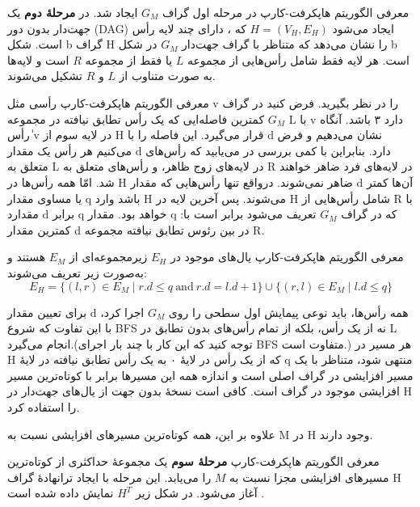 \begin{itemframe}{‌معرفی الگوریتم هاپکرفت-کارپ}
\decLineSpace[-1mm]
\itm
در مرحله اول گراف $G_M$ ایجاد شد. در \textbf{مرحلهٔ دوم} یک جهت‌دار بدون دور (DAG) ایجاد می‌شود $H = (V_H, E_H)$ که ، دارای چند لایه‌ رأس است.
\itm
شکل b گراف H را نشان می‌دهد که متناظر با گراف جهت‌دار $G_M$ در شکل b است. هر لایه فقط شامل رأس‌هایی از مجموعه $L$ یا فقط از مجموعه $R$ است و لایه‌ها به صورت متناوب از $L$ و $R$ تشکیل می‌شوند.
\end{itemframe}


\begin{itemframe}{‌معرفی الگوریتم هاپکرفت-کارپ}
\itm
رأسی مثل v را در نظر بگیرید. فرض کنید در گراف $G_M$ کمترین فاصله‌ایی که یک رأس تطابق نیافته در مجموعه L با v دارد ۳ باشد. آنگاه ٰرأس v در لایه سوم از H‌ قرار می‌‌گیرد. این فاصله را با d نشان می‌دهیم و فرض می‌کنیم هر رأس یک مقدار d دارد.
\itm
بنابراین با کمی بررسی در می‌یابید که رأس‌های متعلق به L در لایه‌های زوج ظاهر، و رأس‌های متعلق به R در لایه‌های فرد ضاهر خواهند شد.
\itm
امّا همه رأس‌ها در H ضاهر نمی‌شوند. درواقع تنها رأس‌هایی که مقدار d آن‌ها کمتر یا مساوی مقدار q باشد وارد H می‌شوند. پس آخرین لایه در H شامل رأس‌هایی از R با مقدارد d برابر q خواهد بود.
\itm
مقدار q که در گراف $G_M$ تعریف می‌شود برابر است با: کمترین مقدار d در بین رئوس تطابق نیافته مجموعه R.

\end{itemframe}


\begin{itemframe}{‌معرفی الگوریتم هاپکرفت-کارپ}
\itm
یال‌های موجود در $E_H$ زیرمجموعه‌ای از $E_M$ هستند و به‌صورت زیر تعریف می‌شوند:
$$
E_H = \{ (l, r) \in E_M \mid r.d \leq q \ \text{and} \ r.d = l.d + 1 \} \cup \{ (r, l) \in E_M \mid l.d \leq q \}
$$

\itm
برای تعیین مقدار d همه رأس‌ها، باید نوعی پیمایش اول سطحی را روی $G_M$ اجرا کرد، با این تفاوت که شروع BFS نه از یک رأس، بلکه از تمام رأس‌های بدون تطابق در L انجام می‌گیرد.(توجه کنید که این کار با چند بار اجرای BFS متفاوت است.)
\itm
هر مسیر در H که از یک رأس در لایهٔ ۰ به یک رأس تطابق نیافته در لایهٔ q منتهی شود، متناظر با یک مسیر افزایشی در گراف اصلی است و اندازه همه این مسیرها برابر با کوتاه‌ترین مسیر افزایشی موجود در گراف است. کافی است نسخهٔ بدون جهت از یال‌های جهت‌دار در H را استفاده کرد.

\itm
علاوه بر این، همه کوتاه‌ترین مسیرهای افزایشی نسبت به M در H وجود دارند.
\end{itemframe}


\begin{itemframe}{‌معرفی الگوریتم هاپکرفت-کارپ}
\itm
\textbf{مرحلهٔ سوم}
یک مجموعهٔ حداکثری از کوتاه‌ترین مسیرهای افزایشی مجزا نسبت به $M$ را می‌یابد.
این مرحله با ایجاد ترانهادهٔ گراف H آغاز می‌شود. در شکل زیر $H^T$ نمایش داده شده است .
\end{itemframe}


